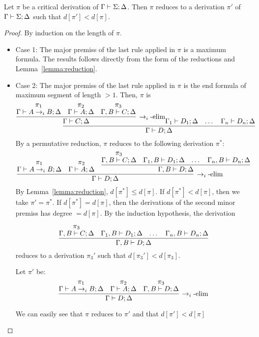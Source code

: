 \begin{lemma}\label{lemma:critical}
  Let $\pi$ be a critical derivation of $\Gamma\vdash\Sigma;\Delta$. Then $\pi$ reduces to a derivation $\pi'$ of $\Gamma\vdash\Sigma;\Delta$ such that $d[\pi'] < d[\pi]$.
\end{lemma}
\begin{proof}
  By induction on the length of $\pi$.
  \begin{itemize}
  \item Case 1: The major premiss of the last rule applied in $\pi$ is a maximum formula. The results follows directly from the form of the reductions and Lemma~\ref{lemma:reduction}.
  \item Case 2: The major premiss of the last rule applied in $\pi$ is the end formula of maximum segment of length $> 1$.
    Then, $\pi$ is
    \[\infer{\stp{\Gamma}{D}{\Delta}}
      {\infer[\iimpe]{\stp{\Gamma}{C}{\Delta}}
        {\deduce{\stp{\Gamma}{A\iimp B}{\Delta}}
          {\pi_1}&
          \deduce{\stp{\Gamma}{A}{\Delta}}
          {\pi_2}&
          \deduce{\stp{\Gamma, B}{C}{\Delta}}
          {\pi_3}}
        \stp{\Gamma_1}{D_1}{\Delta}&
        \dots&
        \stp{\Gamma_n}{D_n}{\Delta}}
    \]
    By a permutative reduction, $\pi$ reduces to the following derivation $\pi^*$:
    \[\infer[\iimpe]{\stp{\Gamma}{D}{\Delta}}
      {\deduce{\stp{\Gamma}{A\iimp B}{\Delta}}
        {\pi_1}&
        \deduce{\stp{\Gamma}{A}{\Delta}}
        {\pi_2}&
        \infer{\stp{\Gamma, B}{D}{\Delta}}{
          \deduce{\stp{\Gamma, B}{C}{\Delta}}
          {\pi_3}&
          \stp{\Gamma_1, B}{D_1}{\Delta}&
          \dots&
          \stp{\Gamma_n, B}{D_n}{\Delta}}}
    \]
    By Lemma~\ref{lemma:reduction}, $d[\pi^*]\leq d[\pi]$. If $d[\pi^*]<d[\pi]$, then we take $\pi'=\pi^*$.
    If $d[\pi^*]=d[\pi]$, then the derivations of the second minor premiss has degree $= d[\pi]$.
    By the induction hypothesis, the derivation

    \[\infer{\stp{\Gamma, B}{D}{\Delta}}
      {\deduce{\stp{\Gamma, B}{C}{\Delta}}
        {\pi_3}&
        \stp{\Gamma_1, B}{D_1}{\Delta}&
        \dots&
        \stp{\Gamma_n, B}{D_n}{\Delta}}
    \]
    reduces to a derivation $\pi_3'$ such that $d[\pi_3']<d[\pi_3]$.

    Let $\pi'$ be:
    \[\infer[\iimpe]{\stp{\Gamma}{D}{\Delta}}
      {\deduce{\stp{\Gamma}{A\iimp B}{\Delta}}
        {\pi_1}&
        \deduce{\stp{\Gamma}{A}{\Delta}}
        {\pi_2}&
        \deduce{\stp{\Gamma, B}{D}{\Delta}}
        {\pi_3}}
    \]

    We can easily see that $\pi$ reduces to $\pi'$ and that $d[\pi']<d[\pi]$
  \end{itemize}
\end{proof}

